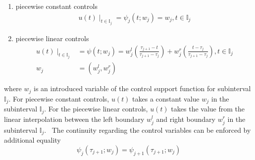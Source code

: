 \documentclass  [
  paper    = a4,
  BCOR     = 10mm,
  twoside,
  fontsize = 12pt,
  fleqn,
  toc      = bibnumbered,
  toc      = listofnumbered,
  numbers  = noendperiod,
  headings = normal,
  listof   = leveldown,
  version  = 3.03
]                                       {scrreprt}
\newcommand{\<}{\langle}
\renewcommand{\>}{\rangle}
\begin{document}
\begin{enumerate}
	\item piecewise constant controls
	\begin{align}
	 u(t) \mid_{t \in \mathbb{I}_j} = \psi_j(t;w_j)= w_j, t \in \mathbb{I}_j
	 \end{align}
	\item piecewise linear controls
		\begin{align}
		u(t) \mid_{t \in \mathbb{I}_j} &= \psi(t;w_j)= w_j^l (\frac{\tau_{j+1} -t }{\tau_{j+1} - \tau_j}) + w_j^r (\frac{t- \tau_j}{\tau_{j+1} - \tau_j}) , t \in \mathbb{I}_j \\
		w_j &= (w_j^l, w_j^r)
	\end{align} 
\end{enumerate}

where $w_j$ is an introduced variable of the control support function for subinterval $ \mathbb{I}_j$. For piecewise constant controls, $u(t)$ takes a constant value $w_j$ in the subinterval $\mathbb{I}_j$. For the piecewise linear controls, $u(t)$ takes the value from the linear interpolation between the left boundary $w_j^l$ and right boundary $w_j^r$ in the subinterval $\mathbb{I}_j$.  The continuity regarding the control variables can be enforced by additional equality 
\begin{equation}
	\psi_j(\tau_{j+1};w_j) =  \psi_{j+1}(\tau_{j+1};w_j)
\end{equation}
\end{document}
